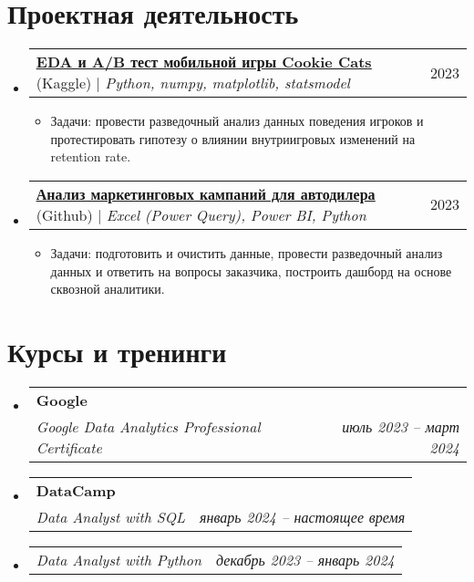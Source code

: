 \documentclass[letterpaper,11pt]{article}
\makeatletter
\newcommand{\resumeItem}[1]{
  \item\small{
    {#1 \vspace{-2pt}}
  }
}
\newcommand{\resumeSubheading}[4]{
  \vspace{-2pt}\item
    \begin{tabular*}{0.97\textwidth}[t]{l@{\extracolsep{\fill}}r}
      \textbf{#1} & #2 \\
      \textit{\small#3} & \textit{\small #4} \\
    \end{tabular*}\vspace{-7pt}
}
\newcommand{\resumeSubSubheading}[2]{
    \item
    \begin{tabular*}{0.97\textwidth}{l@{\extracolsep{\fill}}r}
      \textit{\small#1} & \textit{\small #2} \\
    \end{tabular*}\vspace{-7pt}
}
\newcommand{\resumeProjectHeading}[2]{
    \item
    \begin{tabular*}{0.97\textwidth}{l@{\extracolsep{\fill}}r}
      \small#1 & #2 \\
    \end{tabular*}\vspace{-7pt}
}
\newcommand{\resumeSubHeadingListStart}{\begin{itemize}[leftmargin=0.15in, label={}]}
\newcommand{\resumeSubHeadingListEnd}{\end{itemize}}
\newcommand{\resumeItemListStart}{\begin{itemize}}
\newcommand{\resumeItemListEnd}{\end{itemize}\vspace{-5pt}}
\makeatother
\begin{document}
\section{Проектная деятельность}
    \resumeSubHeadingListStart
      \resumeProjectHeading
          {\href{https://www.kaggle.com/code/vladkovnerov/mobile-game-a-b-testing-with-cookie-cats}{\underline{\textbf{EDA и A/B тест мобильной игры Cookie Cats}}} {(Kaggle)} $|$ \emph{Python, numpy, matplotlib, statsmodel}}{2023}
          \resumeItemListStart
            \resumeItem{Задачи: провести разведочный анализ данных поведения игроков и протестировать гипотезу о влиянии внутриигровых изменений на retention rate.}
          \resumeItemListEnd
      \resumeProjectHeading
          {\href{https://github.com/DragonSigh/portfolio-and-projects/tree/main/Analyzing\%20the\%20Effectiveness\%20of\%20Marketing\%20Campaigns\%20on\%20the\%20Internet}{\underline{\textbf{Анализ маркетинговых кампаний для автодилера}}} {(Github)} $|$ \emph{Excel (Power Query), Power BI, Python}}{2023}
          \resumeItemListStart
            \resumeItem{Задачи: подготовить и очистить данные, провести разведочный анализ данных и ответить на вопросы заказчика, построить дашборд на основе сквозной аналитики.}
          \resumeItemListEnd
    \resumeSubHeadingListEnd


\section{Курсы и тренинги}
  \resumeSubHeadingListStart
    \resumeSubheading
      {Google}{}
      {Google Data Analytics Professional Certificate}{июль 2023 -- март 2024}
    \resumeSubheading
      {DataCamp}{}
      {Data Analyst with SQL}{январь 2024 -- настоящее время}
    \resumeSubSubheading
      {Data Analyst with Python}{декабрь 2023 -- январь 2024}
  \resumeSubHeadingListEnd

\end{document}
